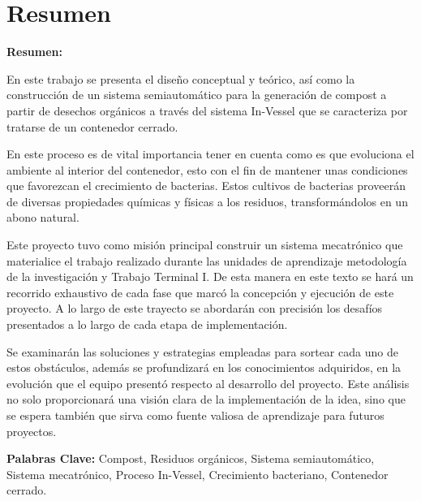 \chapter{Resumen}


\textbf{Resumen:}

En este trabajo se presenta el diseño conceptual y teórico, así como la construcción de un sistema semiautomático para la generación de compost a partir de desechos orgánicos a través del sistema In-Vessel que se caracteriza por tratarse de un contenedor cerrado.

En este proceso es de vital importancia tener en cuenta como es que evoluciona el ambiente al interior del contenedor, esto con el fin de mantener unas condiciones que favorezcan el crecimiento de bacterias. Estos cultivos de bacterias proveerán de diversas propiedades químicas y físicas a los residuos, transformándolos en un abono natural.

Este proyecto tuvo como misión principal construir un sistema mecatrónico que materialice el trabajo realizado durante las unidades de aprendizaje metodología de la investigación y Trabajo Terminal I. De esta manera en este texto se hará un recorrido exhaustivo de cada fase que marcó la concepción y ejecución de este proyecto. A lo largo de este trayecto se abordarán con precisión los desafíos presentados a lo largo de cada etapa de implementación.

Se examinarán las soluciones y estrategias empleadas para sortear cada uno de estos obstáculos, además se profundizará en los conocimientos adquiridos, en la evolución que el equipo presentó respecto al desarrollo del proyecto. Este análisis no solo proporcionará una visión clara de la implementación de la idea, sino que se espera también que sirva como fuente valiosa de aprendizaje para futuros proyectos.



\textbf{Palabras Clave:} Compost, Residuos orgánicos, Sistema semiautomático, Sistema mecatrónico, Proceso In-Vessel, Crecimiento bacteriano, Contenedor cerrado.


\endinput 